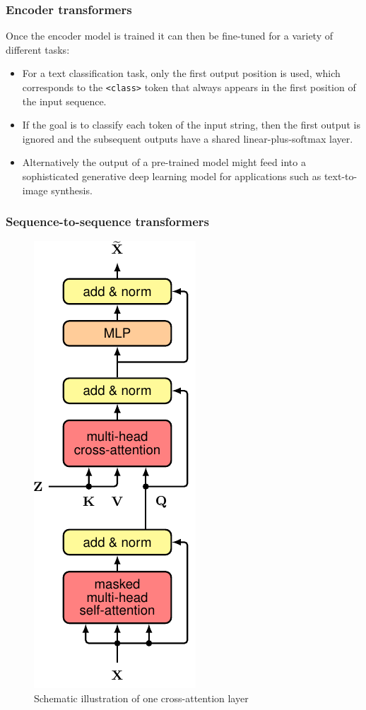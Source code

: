 \documentclass{beamer}
\begin{document}
\begin{frame}
    \frametitle{Encoder transformers}
    Once the encoder model is trained it can then be fine-tuned for a variety of different tasks:
    \begin{itemize}
        \item For a text classification task, only the first output position is used, which corresponds to the {\tt <class>} token that always appears in the first position of the input sequence.
        \item If the goal is to classify each token of the input string, then the first output is ignored and the subsequent outputs have a shared linear-plus-softmax layer.
        \item Alternatively the output of a pre-trained model might feed into a sophisticated generative deep learning model for applications such as text-to-image synthesis.
    \end{itemize}
\end{frame}

\begin{frame}
    \frametitle{Sequence-to-sequence transformers}
    \begin{figure}
        \caption{Schematic illustration of one cross-attention layer}
        \includegraphics[height=0.7\textheight]{Figure_19.pdf}
    \end{figure}
\end{frame}
\end{document}
